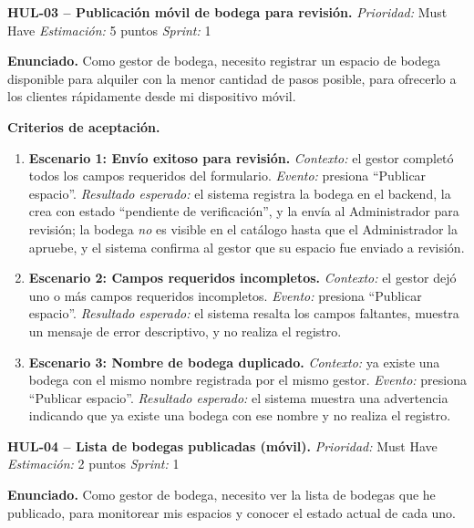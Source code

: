 \textbf{HUL-03 -- Publicación móvil de bodega para revisión.} \label{req:HUL-03}
\textit{Prioridad:} Must Have \quad \textit{Estimación:} 5 puntos \quad \textit{Sprint:} 1

\textbf{Enunciado.} Como gestor de bodega, necesito registrar un espacio de bodega disponible para alquiler con la menor cantidad de pasos posible, para ofrecerlo a los clientes rápidamente desde mi dispositivo móvil.

\textbf{Criterios de aceptación.}
\begin{enumerate}
\item \textbf{Escenario 1: Envío exitoso para revisión.} \textit{Contexto:} el gestor completó todos los campos requeridos del formulario. \textit{Evento:} presiona ``Publicar espacio''. \textit{Resultado esperado:} el sistema registra la bodega en el backend, la crea con estado ``pendiente de verificación'', y la envía al Administrador para revisión; la bodega \textit{no} es visible en el catálogo hasta que el Administrador la apruebe, y el sistema confirma al gestor que su espacio fue enviado a revisión.
\item \textbf{Escenario 2: Campos requeridos incompletos.} \textit{Contexto:} el gestor dejó uno o más campos requeridos incompletos. \textit{Evento:} presiona ``Publicar espacio''. \textit{Resultado esperado:} el sistema resalta los campos faltantes, muestra un mensaje de error descriptivo, y no realiza el registro.
\item \textbf{Escenario 3: Nombre de bodega duplicado.} \textit{Contexto:} ya existe una bodega con el mismo nombre registrada por el mismo gestor. \textit{Evento:} presiona ``Publicar espacio''. \textit{Resultado esperado:} el sistema muestra una advertencia indicando que ya existe una bodega con ese nombre y no realiza el registro.
\end{enumerate}

\textbf{HUL-04 -- Lista de bodegas publicadas (móvil).} \label{req:HUL-04}
\textit{Prioridad:} Must Have \quad \textit{Estimación:} 2 puntos \quad \textit{Sprint:} 1

\textbf{Enunciado.} Como gestor de bodega, necesito ver la lista de bodegas que he publicado, para monitorear mis espacios y conocer el estado actual de cada uno.

